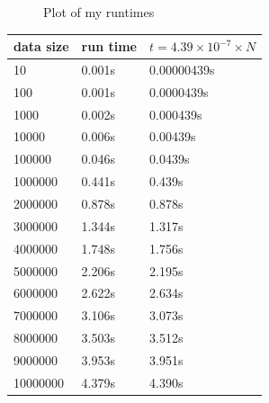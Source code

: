 \documentclass{article}
\begin{document}
 \begin{figure}
   \centering
 
   \caption{Plot of my runtimes}
   \label{fig:experiment1}
 \end{figure}


 \begin{center}
 \begin{tabular}{l||l|l|}
   data size   & run time    & $t = 4.39\times 10^{-7} \times N$ \\  \hline
   10          & 0.001s      & 0.00000439s  \\
   100         & 0.001s      & 0.0000439s  \\
   1000        & 0.002s      & 0.000439s  \\
   10000       & 0.006s      & 0.00439s  \\
   100000      & 0.046s      & 0.0439s  \\
   1000000     & 0.441s      & 0.439s  \\
   2000000     & 0.878s      & 0.878s  \\
   3000000     & 1.344s      & 1.317s  \\
   4000000     & 1.748s      & 1.756s  \\
   5000000     & 2.206s      & 2.195s  \\
   6000000     & 2.622s      & 2.634s  \\
   7000000     & 3.106s      & 3.073s  \\
   8000000     & 3.503s      & 3.512s  \\
   9000000     & 3.953s      & 3.951s  \\
   10000000    & 4.379s      & 4.390s  \\

 \end{tabular}
 \end{center}
\end{document}
